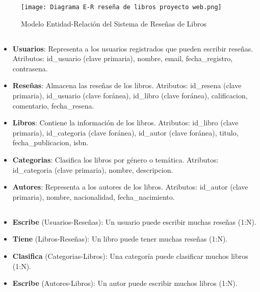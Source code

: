 \documentclass[10pt,a4paper]{article}
\begin{document}
\begin{figure}[H]
	\centering
	\texttt{[image: Diagrama E-R reseña de libros proyecto web.png]}
	\caption{Modelo Entidad-Relación del Sistema de Reseñas de Libros}
	\label{fig:diagrama_er}
\end{figure}

\subsection{\color{colorESCOM}{Descripción de las Entidades}}
\begin{itemize}
	\item \textbf{Usuarios}: Representa a los usuarios registrados que pueden escribir reseñas. Atributos: id\_usuario (clave primaria), nombre, email, fecha\_registro, contrasena.
	\item \textbf{Reseñas}: Almacena las reseñas de los libros. Atributos: id\_resena (clave primaria), id\_usuario (clave foránea), id\_libro (clave foránea), calificacion, comentario, fecha\_resena.
	\item \textbf{Libros}: Contiene la información de los libros. Atributos: id\_libro (clave primaria), id\_categoria (clave foránea), id\_autor (clave foránea), titulo, fecha\_publicacion, isbn.
	\item \textbf{Categorias}: Clasifica los libros por género o temática. Atributos: id\_categoria (clave primaria), nombre, descripcion.
	\item \textbf{Autores}: Representa a los autores de los libros. Atributos: id\_autor (clave primaria), nombre, nacionalidad, fecha\_nacimiento.
\end{itemize}

\subsection{\color{colorESCOM}{Relaciones}}
\begin{itemize}
	\item \textbf{Escribe} (Usuarios-Reseñas): Un usuario puede escribir muchas reseñas (1:N).
	\item \textbf{Tiene} (Libros-Reseñas): Un libro puede tener muchas reseñas (1:N).
	\item \textbf{Clasifica} (Categorias-Libros): Una categoría puede clasificar muchos libros (1:N).
	\item \textbf{Escribe} (Autores-Libros): Un autor puede escribir muchos libros (1:N).
\end{itemize}
\end{document}

